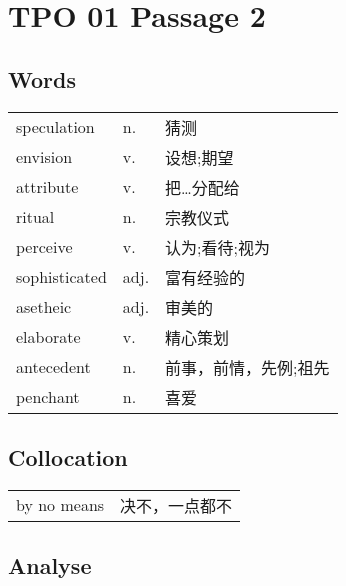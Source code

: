 \section{TPO 01 Passage 2}

\subsection{Words}

\begin{tabular}{lll}
  speculation   & n.   & 猜测          \\
  envision      & v.   & 设想;期望       \\
  attribute     & v.   & 把…分配给       \\
  ritual        & n.   & 宗教仪式        \\
  perceive      & v.   & 认为;看待;视为    \\
  sophisticated & adj. & 富有经验的       \\
  asetheic      & adj. & 审美的         \\
  elaborate     & v.   & 精心策划        \\
  antecedent    & n.   & 前事，前情，先例;祖先 \\
  penchant      & n.   & 喜爱          \\
\end{tabular}

\subsection{Collocation}

\begin{tabular}{ll}
  by no means & 决不，一点都不 \\
\end{tabular}

\subsection{Analyse}

